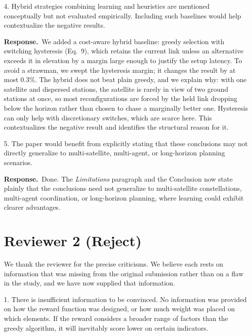 \documentclass[11pt]{article}
\newcommand{\resp}{\par\smallskip\noindent\textbf{Response.}\ }
\begin{document}
\begin{rc}
4. Hybrid strategies combining learning and heuristics are mentioned conceptually
but not evaluated empirically. Including such baselines would help contextualize the
negative results.
\end{rc}

\resp We added a cost-aware hybrid baseline: greedy selection with switching
hysteresis (Eq.~9), which retains the current link unless an alternative exceeds it
in elevation by a margin large enough to justify the setup latency. To avoid a
strawman, we swept the hysteresis margin; it changes the result by at most $0.3\%$.
The hybrid does not beat plain greedy, and we explain why: with one satellite and
dispersed stations, the satellite is rarely in view of two ground stations at once,
so most reconfigurations are forced by the held link dropping below the horizon
rather than chosen to chase a marginally better one. Hysteresis can only help with
discretionary switches, which are scarce here. This contextualizes the negative
result and identifies the structural reason for it.

\begin{rc}
5. The paper would benefit from explicitly stating that these conclusions may not
directly generalize to multi-satellite, multi-agent, or long-horizon planning
scenarios.
\end{rc}

\resp Done. The \emph{Limitations} paragraph and the Conclusion now state plainly
that the conclusions need not generalize to multi-satellite constellations,
multi-agent coordination, or long-horizon planning, where learning could exhibit
clearer advantages.

\section*{Reviewer 2 (Reject)}

We thank the reviewer for the precise criticisms. We believe each rests on
information that was missing from the original submission rather than on a flaw in
the study, and we have now supplied that information.

\begin{rc}
1. There is insufficient information to be convinced. No information was provided on
how the reward function was designed, or how much weight was placed on which
elements. If the reward considers a broader range of factors than the greedy
algorithm, it will inevitably score lower on certain indicators.
\end{rc}
\end{document}
